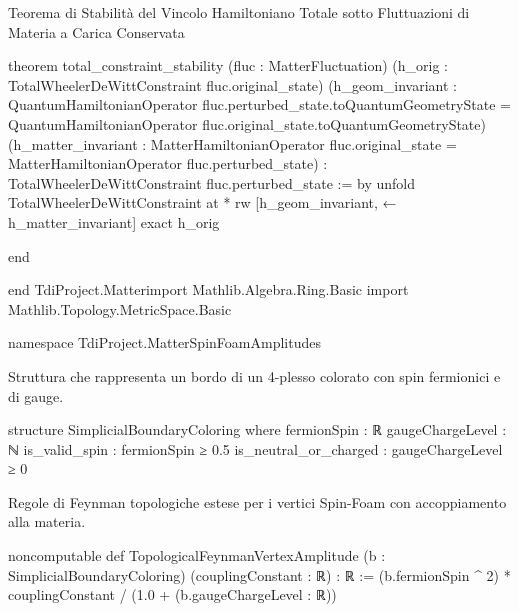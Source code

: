 \documentclass{article}
\newenvironment{Shaded}{%
  \begin{snugshade}%
}{%
  \end{snugshade}%
}%
\newenvironment{Highlighting}{%
}{%
}%
\newcommand{\NormalTok}[1]{#1}
\begin{document}
Teorema di Stabilità del Vincolo Hamiltoniano Totale sotto Fluttuazioni
di Materia a Carica Conservata

\begin{Shaded}
\begin{Highlighting}[]
\NormalTok{theorem total\_constraint\_stability (fluc : MatterFluctuation)}
\NormalTok{  (h\_orig : TotalWheelerDeWittConstraint fluc.original\_state)}
\NormalTok{  (h\_geom\_invariant : QuantumHamiltonianOperator fluc.perturbed\_state.toQuantumGeometryState = }
\NormalTok{                      QuantumHamiltonianOperator fluc.original\_state.toQuantumGeometryState)}
\NormalTok{  (h\_matter\_invariant : MatterHamiltonianOperator fluc.original\_state = MatterHamiltonianOperator fluc.perturbed\_state) :}
\NormalTok{  TotalWheelerDeWittConstraint fluc.perturbed\_state := by}
\NormalTok{  unfold TotalWheelerDeWittConstraint at *}
\NormalTok{  rw [h\_geom\_invariant, ← h\_matter\_invariant]}
\NormalTok{  exact h\_orig}

\NormalTok{end}

\NormalTok{end TdiProject.Matterimport Mathlib.Algebra.Ring.Basic}
\NormalTok{import Mathlib.Topology.MetricSpace.Basic}

\NormalTok{namespace TdiProject.MatterSpinFoamAmplitudes}

\end{Highlighting}
\end{Shaded}

Struttura che rappresenta un bordo di un 4-plesso colorato con spin
fermionici e di gauge.

\begin{Shaded}
\begin{Highlighting}[]
\NormalTok{structure SimplicialBoundaryColoring where}
\NormalTok{  fermionSpin : ℝ}
\NormalTok{  gaugeChargeLevel : ℕ}
\NormalTok{  is\_valid\_spin : fermionSpin ≥ 0.5}
\NormalTok{  is\_neutral\_or\_charged : gaugeChargeLevel ≥ 0}

\end{Highlighting}
\end{Shaded}

Regole di Feynman topologiche estese per i vertici Spin-Foam con
accoppiamento alla materia.

\begin{Shaded}
\begin{Highlighting}[]
\NormalTok{noncomputable def TopologicalFeynmanVertexAmplitude (b : SimplicialBoundaryColoring) (couplingConstant : ℝ) : ℝ :=}
\NormalTok{  (b.fermionSpin \^{} 2) * couplingConstant / (1.0 + (b.gaugeChargeLevel : ℝ))}

\end{Highlighting}
\end{Shaded}
\end{document}
